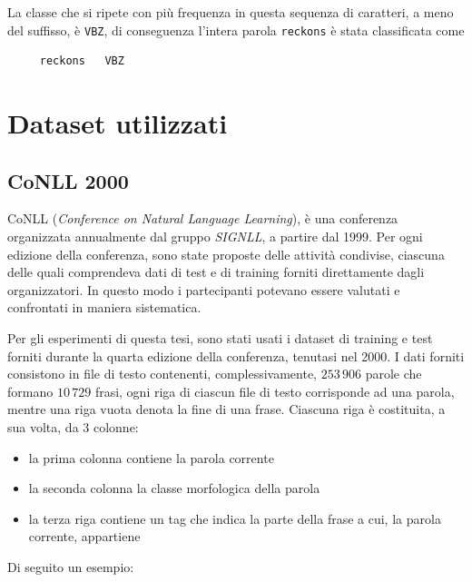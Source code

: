 La classe che si ripete con pi\`u frequenza in questa sequenza di caratteri, a
meno del suffisso, \`e \texttt{VBZ}, di conseguenza l'intera parola \texttt{reckons}
\`e stata classificata come

\begin{center}
  \begin{minipage}{5cm}
    \begin{verbatim}
     reckons   VBZ
    \end{verbatim}
  \end{minipage}
\end{center}

\section{Dataset utilizzati}
\nocite{Zanchetta:2005}
\nocite{Attardi:2008}

\subsection{CoNLL 2000}
CoNLL (\emph{Conference on Natural Language Learning}), \`e una conferenza
organizzata annualmente dal gruppo \emph{SIGNLL}, a partire dal 1999. Per ogni
edizione della conferenza, sono state proposte delle attivit\`a condivise, ciascuna
delle quali comprendeva dati di test e di training forniti direttamente dagli
organizzatori. In questo modo i partecipanti potevano essere valutati e
confrontati in maniera sistematica.

Per gli esperimenti di questa tesi, sono stati usati i dataset di training e
test forniti durante la quarta edizione della conferenza, tenutasi nel 2000.
I dati forniti consistono in file di testo contenenti, complessivamente, $253\,906$
parole che formano $10\,729$ frasi, ogni riga di ciascun file di testo corrisponde
ad una parola, mentre una riga vuota denota la fine di una frase. Ciascuna riga
\`e costituita, a sua volta, da 3 colonne:

\begin{itemize}
  \item la prima colonna contiene la parola corrente
  \item la seconda colonna la classe morfologica della parola
  \item la terza riga contiene un tag che indica la parte della frase a cui,
        la parola corrente, appartiene
\end{itemize}

Di seguito un esempio:

